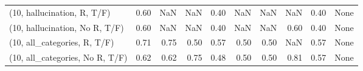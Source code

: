 \begin{table*}[h!]
\begin{adjustbox}{width=2\columnwidth,center}
\begin{tabular}{lrrr|rrr|rrr}
(10, hallucination, R, T/F)           &                      0.60 &                   NaN &                       NaN &                          0.40 &                       NaN &                           NaN &                                    NaN &                               0.40 &                                  None \\
(10, hallucination, No R, T/F)        &                      0.60 &                   NaN &                       NaN &                          0.40 &                       NaN &                           NaN &                                   0.60 &                               0.40 &                                  None \\
(10, all\_categories, R, T/F)          &                      0.71 &                  0.75 &                      0.50 &                          0.57 &                      0.50 &                          0.50 &                                    NaN &                               0.57 &                                  None \\
(10, all\_categories, No R, T/F)       &                      0.62 &                  0.62 &                      0.75 &                          0.48 &                      0.50 &                          0.50 &                                   0.81 &                               0.57 &                                  None \\




\end{tabular}
\end{adjustbox}
\end{table*}
